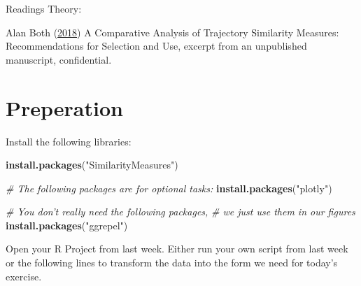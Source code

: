 \documentclass[]{book}
\newenvironment{Shaded}{\begin{snugshade}}{\end{snugshade}}
\newcommand{\CommentTok}[1]{\textcolor[rgb]{0.56,0.35,0.01}{\textit{#1}}}
\newcommand{\KeywordTok}[1]{\textcolor[rgb]{0.13,0.29,0.53}{\textbf{#1}}}
\newcommand{\NormalTok}[1]{#1}
\newcommand{\StringTok}[1]{\textcolor[rgb]{0.31,0.60,0.02}{#1}}
\begin{document}
Readings Theory:

Alan Both (\protect\hyperlink{ref-both2018}{2018}) A Comparative Analysis of Trajectory Similarity Measures: Recommendations for Selection and Use, excerpt from an unpublished manuscript, confidential.

\hypertarget{preperation-2}{%
\section{Preperation}\label{preperation-2}}

Install the following libraries:

\begin{Shaded}
\begin{Highlighting}[]
\KeywordTok{install.packages}\NormalTok{(}\StringTok{"SimilarityMeasures"}\NormalTok{)}

\CommentTok{# The following packages are for optional tasks:}
\KeywordTok{install.packages}\NormalTok{(}\StringTok{"plotly"}\NormalTok{)}

\CommentTok{# You don't really need the following packages, }
\CommentTok{# we just use them in our figures}
\KeywordTok{install.packages}\NormalTok{(}\StringTok{"ggrepel"}\NormalTok{)}
\end{Highlighting}
\end{Shaded}

Open your R Project from last week. Either run your own script from last week or the following lines to transform the data into the form we need for today's exercise.
\end{document}
